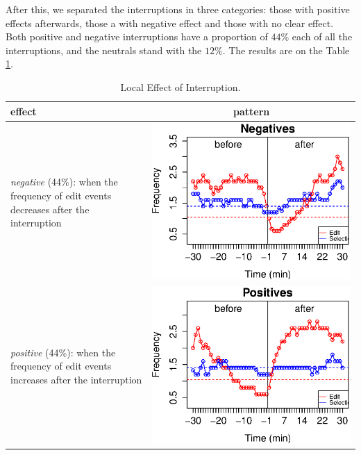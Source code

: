 \documentclass[conference]{IEEEtran}
\begin{document}
After this, we separated the interruptions in three categories: those with positive effects afterwards, those a with negative effect and those with no clear effect. Both positive and negative interruptions have a proportion of $44\%$ each of all the interruptions, and the neutrals stand with the $12\%$. The results are on the Table \ref{tbl:local_effect_udc}.

\begin{table}[ht!]
\caption{Local Effect of Interruption. }
\label{tbl:local_effect_udc}
\centering
\begin{tabular}{p{4cm} | c}
effect & pattern \\
\hline
\textit{negative} (44\%): when the frequency of edit events decreases after the interruption
	& \includegraphics[valign=m,scale=0.3]{figures/udc_neg_ints} \\
\textit{positive} (44\%): when the frequency of edit events increases after the interruption 
	& \includegraphics[valign=m,scale=0.3]{figures/udc_pos_ints} \\

\end{tabular}
\end{table}
\end{document}
